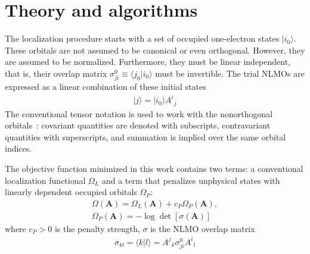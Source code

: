 \documentclass[aps,prl,reprint,amsmath,amssymb]{revtex4-1}
\newcommand{\ket}[1]{\ensuremath{\vert #1 \rangle}}
\newcommand{\braket}[2]{\ensuremath{\langle #1 \vert #2 \rangle}} %
\begin{document}
\section{Theory and algorithms}


The localization procedure starts with a set of occupied  one-electron states $\ket{i_0}$. 
These orbitals are not assumed to be canonical or even orthogonal. 
However, they are assumed to be normalized. 
Furthermore, they must be linear independent, that is, their overlap matrix $\sigma_{ji}^0 \equiv \braket{j_0}{i_0}$ must be invertible. 
The trial NLMOs are expressed as a linear combination of these initial states
%
\begin{equation}
\begin{split}
\ket{j} = \ket{i_0} {A^i}_j  
\end{split}
\end{equation}
%
The conventional tensor notation is used to work with the nonorthogonal orbitals~\cite{head1998tensor}: covariant quantities are denoted with subscripts, contravariant quantities with superscripts, and summation is implied over the same orbital indices.

The objective function minimized in this work contains two terms: a conventional localization functional $\Omega_L$ and a term that penalizes unphysical states with linearly dependent occupied orbitals $\Omega_P$:
%
\begin{equation} \label{eq:fun-pen}
\begin{split}
\Omega(\mathbf{A}) = \Omega_L(\mathbf{A}) + c_P \Omega_P(\mathbf{A}), \\
\Omega_P(\mathbf{A}) = - \log \det \left[ \sigma (\mathbf{A}) \right]
\end{split}
\end{equation}
%
where $c_P > 0$ is the penalty strength, $\sigma$ is the NLMO overlap matrix 
%
\begin{equation}
\begin{split}
\sigma_{kl} = \braket{k}{l} = {A^j}_k \sigma_{ji}^0{A^i}_l
\end{split}
\end{equation}
%
\end{document}
